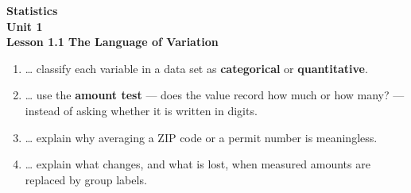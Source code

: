 \documentclass[12pt]{article}
\begin{document}
\vspace{-0.8in}

\begin{center}
  {\color{white}\textbf{\LARGE Statistics}}\\[4pt]
  {\color{skymid}\large\textbf{Unit 1}}\\[6pt]
  {\color{white}\textbf{\large Lesson 1.1 \quad The Language of Variation}}
\end{center}

\vspace{0.22in}
\namedateperiod
\vspace{0.18in}

\boxguard[14]
\begin{learningtargetbox}
\small
\begin{enumerate}[leftmargin=1.5em, itemsep=5pt]
  \item \ldots{} classify each variable in a data set as \textbf{categorical} or
        \textbf{quantitative}.
  \item \ldots{} use the \textbf{amount test} --- does the value record how much or how many?
        --- instead of asking whether it is written in digits.
  \item \ldots{} explain why averaging a ZIP code or a permit number is meaningless.
  \item \ldots{} explain what changes, and what is lost, when measured amounts are replaced by
        group labels.
\end{enumerate}
\end{learningtargetbox}

\vspace{0.14in}
\end{document}
